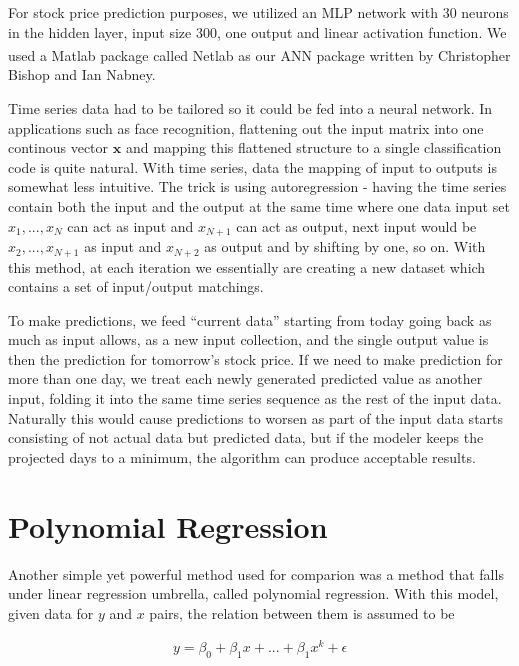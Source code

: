 For stock price prediction purposes, we utilized an MLP network with 30 neurons
in the hidden layer, input size 300, one output and linear activation
function. We used a Matlab\textsuperscript{\textregistered} package called
Netlab as our ANN package written by Christopher Bishop and Ian Nabney.

Time series data had to be tailored so it could be fed into a neural network. In
applications such as face recognition, flattening out the input matrix into one
continous vector $\mathbf{x}$ and mapping this flattened structure to a single
classification code is quite natural. With time series, data the mapping of
input to outputs is somewhat less intuitive. The trick is using autoregression -
having the time series contain both the input and the output at the same time
where one data input set $x_1,...,x_N$ can act as input and $x_{N+1}$ can act as
output, next input would be $x_2,...,x_{N+1}$ as input and $x_{N+2}$ as output
and by shifting by one, so on. With this method, at each iteration we
essentially are creating a new dataset which contains a set of input/output
matchings.

To make predictions, we feed ``current data'' starting from today going back as
much as input allows, as a new input collection, and the single output value is
then the prediction for tomorrow's stock price. If we need to make prediction
for more than one day, we treat each newly generated predicted value as another
input, folding it into the same time series sequence as the rest of the input
data. Naturally this would cause predictions to worsen as part of the input data
starts consisting of not actual data but predicted data, but if the modeler
keeps the projected days to a minimum, the algorithm can produce acceptable
results.

\section{Polynomial Regression}

Another simple yet powerful method used for comparion was a method that falls
under linear regression umbrella, called polynomial regression. With this model,
given data for $y$ and $x$ pairs, the relation between them is assumed to be

\begin{eqnarray*}
y = \beta_0 + \beta_1x + ... + \beta_1x^k + \epsilon
\end{eqnarray*}

